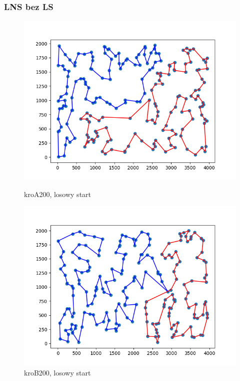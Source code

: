 \documentclass[11pt]{article}
\begin{document}
\subsubsection{LNS bez LS}

\begin{figure}[H]
    \begin{minipage}[t]{0.45\textwidth}
        \centering
        \includegraphics[width=\linewidth]{best_paths/kroA200/LNS_bez}
        \caption{kroA200, losowy start}
    \end{minipage}
    \hfill
    \begin{minipage}[t]{0.45\textwidth}
        \centering
        \includegraphics[width=\linewidth]{best_paths/kroB200/LNS_bez}
        \caption{kroB200, losowy start}
    \end{minipage}\label{fig:figure4}
\end{figure}
\end{document}
